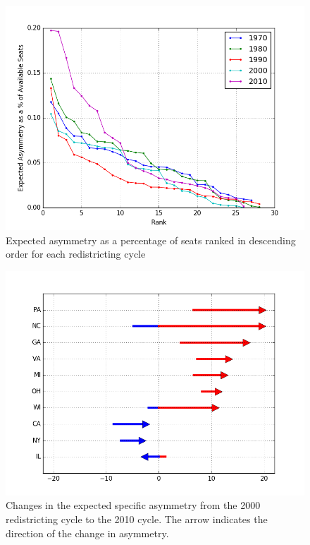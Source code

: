 \documentclass[preprint,12pt]{article}
\begin{document}
\begin{figure}[htb!]
    \begin{center}
        \includegraphics[scale=0.8]{../Figures/ExpectedAsymmetry/asymRank.png}
        \caption{Expected asymmetry as a percentage of seats ranked in descending order for each redistricting cycle}\label{fig:asymRank}
    \end{center}
\end{figure}


\begin{figure}[htb!]
    \begin{center}
        \includegraphics[scale=0.8]{../Figures/ExpectedAsymmetry/diff2000to2010.png}
        \caption{Changes in the expected specific asymmetry from the 2000 redistricting cycle to the 2010 cycle. The arrow indicates the direction of the change in asymmetry.}\label{fig:Asym2000to2010}
    \end{center}
\end{figure}
\end{document}
